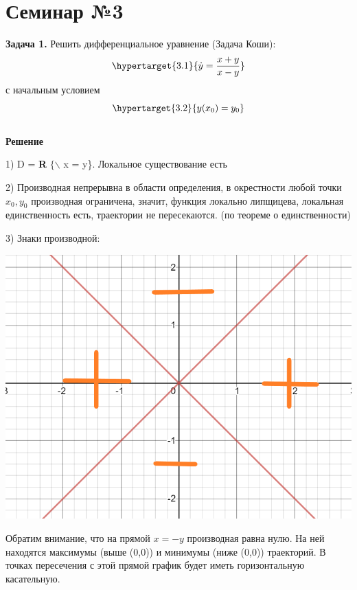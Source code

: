 \documentclass[10pt]{report}
\begin{document}
\chapter[{Семинар №3}]{Семинар №3}
\thispagestyle{empty}
\textbf{Задача 1.} Решить дифференциальное уравнение (Задача Коши): 
\newline
\begin{equation}
\hypertarget{3.1}{\dot{y} =  \frac {x+y} {x-y}}
\end{equation}
\newline
с начальным условием
\newline
\begin{equation}
\hypertarget{3.2}{y(x_0) = y_0}
\end{equation}\\
\textbf {Решение}

1) D = \textbf{R} $\{\backslash$ x = y\}. Локальное существование есть

2) Производная непрерывна в области определения, в окрестности любой точки $x_0, y_0$ производная ограничена, значит, функция локально липщицева, локальная единственность есть, траектории не пересекаются. (по теореме о единственности)

3) Знаки производной:
\begin{center}
{\includegraphics[scale=0.4]{graph3.1.png}} 
\end{center}

Обратим внимание, что на прямой $x = - y$ производная равна нулю. На ней находятся максимумы (выше (0,0)) и минимумы (ниже (0,0)) траекторий.  В точках пересечения с этой прямой график будет иметь горизонтальную касательную. 
\end{document}
